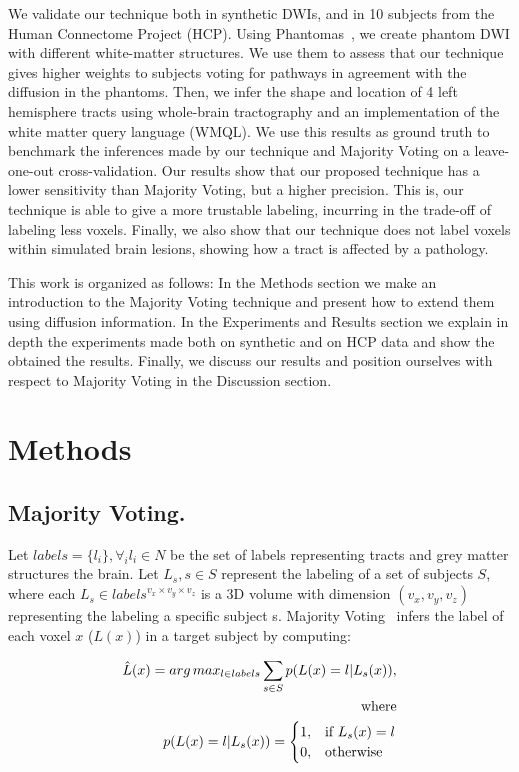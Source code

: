 We validate our technique both in synthetic DWIs, and in 10 subjects from the
Human Connectome Project (HCP). Using Phantomas~\cite{Caruyer2014}, we create
phantom DWI with different white-matter structures. We use them to assess that
our technique gives higher weights to subjects voting for pathways in agreement
with the diffusion in the phantoms. Then, we infer the shape and location of 4
left hemisphere tracts using whole-brain tractography and an implementation of
the white matter query language (WMQL). We use this results as ground truth to
benchmark the inferences made by our technique and Majority Voting on a leave-one-out
cross-validation. Our results show that our proposed technique has a lower
sensitivity than Majority Voting, but a higher precision. This is, our technique
is able to give a more trustable labeling, incurring in the trade-off of labeling
less voxels. Finally, we also show that our technique does not label voxels
within simulated brain lesions, showing how a tract is affected by a pathology.

This work is organized as follows: In the Methods section we make an introduction
to the Majority Voting technique and present how to extend them using diffusion
information. In the Experiments and Results section we explain in depth the
experiments made both on synthetic and on HCP data and show the obtained the
results. Finally, we discuss our results and position ourselves with respect to
Majority Voting in the Discussion section. 

\section{Methods}
\label{sec:methods}

\subsection{Majority Voting.}
Let $labels = \{l_i\}, \forall_i l_i \in N$ be the set of labels representing
tracts and grey matter structures the brain. Let ${L_s}, s\in S$
represent the labeling of a set of subjects $S$, where each 
$L_s \in labels^{v_x\times v_y \times v_z}$ is a 3D volume with dimension $(v_x,v_y,v_z)$
representing the labeling a specific subject s. Majority Voting~\cite{Rohlfing2004} infers the label of
each voxel $x$ ($L(x)$) in a target subject by computing:

\begin{equation}
\label{eq:mvoting}
\begin{aligned}
    \hat L(x) = arg\,max_{l \in labels} \sum_{s\in S} p(L(x) = l | L_s(x)),\\
    \text{where} \\
    p(L(x) = l | L_s(x)) =
    \begin{cases}
        1,& \text{if } L_s(x) = l \\
        0,& \text{otherwise}
    \end{cases}
\end{aligned}
\end{equation}

